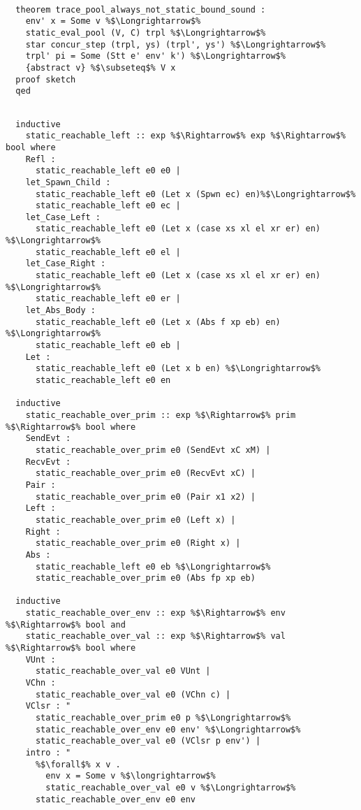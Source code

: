 \documentclass{article}
\begin{document}
\begin{lstlisting}[style=codestyle1, escapechar=\%]

  theorem trace_pool_always_not_static_bound_sound :
    env' x = Some v %$\Longrightarrow$%
    static_eval_pool (V, C) trpl %$\Longrightarrow$% 
    star concur_step (trpl, ys) (trpl', ys') %$\Longrightarrow$%
    trpl' pi = Some (Stt e' env' k') %$\Longrightarrow$%
    {abstract v} %$\subseteq$% V x
  proof sketch
  qed

  \end{lstlisting}


\begin{lstlisting}[style=codestyle1, escapechar=\%]

  inductive
    static_reachable_left :: exp %$\Rightarrow$% exp %$\Rightarrow$% bool where
    Refl :
      static_reachable_left e0 e0 | 
    let_Spawn_Child :
      static_reachable_left e0 (Let x (Spwn ec) en)%$\Longrightarrow$%
      static_reachable_left e0 ec |
    let_Case_Left :
      static_reachable_left e0 (Let x (case xs xl el xr er) en) %$\Longrightarrow$%
      static_reachable_left e0 el |
    let_Case_Right :
      static_reachable_left e0 (Let x (case xs xl el xr er) en) %$\Longrightarrow$%
      static_reachable_left e0 er |
    let_Abs_Body :
      static_reachable_left e0 (Let x (Abs f xp eb) en) %$\Longrightarrow$%
      static_reachable_left e0 eb | 
    Let :
      static_reachable_left e0 (Let x b en) %$\Longrightarrow$%
      static_reachable_left e0 en

  inductive
    static_reachable_over_prim :: exp %$\Rightarrow$% prim %$\Rightarrow$% bool where
    SendEvt :
      static_reachable_over_prim e0 (SendEvt xC xM) |
    RecvEvt :
      static_reachable_over_prim e0 (RecvEvt xC) |
    Pair :
      static_reachable_over_prim e0 (Pair x1 x2) |
    Left :
      static_reachable_over_prim e0 (Left x) |
    Right :
      static_reachable_over_prim e0 (Right x) |
    Abs :
      static_reachable_left e0 eb %$\Longrightarrow$%
      static_reachable_over_prim e0 (Abs fp xp eb) 

  inductive 
    static_reachable_over_env :: exp %$\Rightarrow$% env %$\Rightarrow$% bool and
    static_reachable_over_val :: exp %$\Rightarrow$% val %$\Rightarrow$% bool where
    VUnt :
      static_reachable_over_val e0 VUnt |
    VChn :
      static_reachable_over_val e0 (VChn c) |
    VClsr : "
      static_reachable_over_prim e0 p %$\Longrightarrow$%
      static_reachable_over_env e0 env' %$\Longrightarrow$%
      static_reachable_over_val e0 (VClsr p env') |
    intro : "
      %$\forall$% x v .
        env x = Some v %$\longrightarrow$%
        static_reachable_over_val e0 v %$\Longrightarrow$%
      static_reachable_over_env e0 env


\end{lstlisting}
\end{document}
